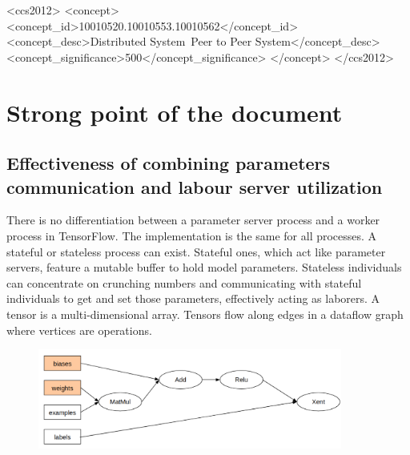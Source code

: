 \documentclass[acmlarge]{acmart}
\begin{document}
\begin{CCSXML}
  <ccs2012>
  <concept>
  <concept_id>10010520.10010553.10010562</concept_id>
  <concept_desc>Distributed System~Peer to Peer System</concept_desc>
  <concept_significance>500</concept_significance>
  </concept>
  </ccs2012>
\end{CCSXML}



\maketitle
\section{Strong point of the document}

\subsection{Effectiveness of combining parameters communication and labour server utilization}
There is no differentiation between a parameter server process and a worker process in TensorFlow. The implementation is the same for all processes. A stateful or stateless process can exist. Stateful ones, which act like parameter servers, feature a mutable buffer to hold model parameters. Stateless individuals can concentrate on crunching numbers and communicating with stateful individuals to get and set those parameters, effectively acting as laborers.
A tensor is a multi-dimensional array. Tensors flow along edges in a dataflow graph where vertices are operations.
\begin{figure}[htbp]
  \centering
  \includegraphics[width=10cm]{./tensor.png}
\end{figure}
\end{document}
